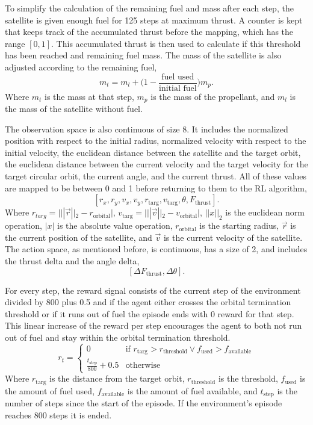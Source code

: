 To simplify the calculation of the remaining fuel and mass after each step, the satellite is given enough fuel for 125 steps at maximum thrust. A counter is kept that keeps track of the accumulated thrust before the mapping, which has the range $[0, 1]$. This accumulated thrust is then used to calculate if this threshold has been reached and remaining fuel mass. The mass of the satellite is also adjusted according to the remaining fuel, $$m_t=m_l+\bigg(1-\frac{\text{fuel used}}{\text{initial fuel}}\bigg)m_p.$$ Where $m_t$ is the mass at that step, $m_p$ is the mass of the propellant, and $m_l$ is the mass of the satellite without fuel.

The observation space is also continuous of size 8. It includes the normalized position with respect to the initial radius, normalized velocity with respect to the initial velocity, the euclidean distance between the satellite and the target orbit, the euclidean distance between the current velocity and the target velocity for the target circular orbit, the current angle, and the current thrust. All of these values are mapped to be between 0 and 1 before returning to them to the RL algorithm,
$$[r_x, r_y, v_x, v_y, r_{\text{targ}}, v_{\text{targ}}, \theta, F_{\text{thrust}}].$$
Where $r_{targ}=|||\vec{r}||_2 - r_\text{orbital}|$, $v_{\text{targ}}=|||\vec{v}||_2-v_\text{orbital}|$, $||x||_2$ is the euclidean norm operation, $|x|$ is the absolute value operation, $r_\text{orbital}$ is the starting radius, $\vec{r}$ is the current position of the satellite, and $\vec{v}$ is the current velocity of the satellite. The action space, as mentioned before, is continuous, has a size of 2, and includes the thrust delta and the angle delta, $$[\Delta F_{\text{thrust}}, \Delta \theta].$$ 

For every step, the reward signal consists of the current step of the environment divided by 800 plus 0.5 and if the agent either crosses the orbital termination threshold or if it runs out of fuel the episode ends with 0 reward for that step. This linear increase of the reward per step encourages the agent to both not run out of fuel and stay within the orbital termination threshold. $$
r_t = \begin{cases}
	0 & \mbox{if }r_{\text{targ}}>r_{\text{threshold}}\lor f_{\text{used}}>f_{\text{available}} \\
	\frac{t_{\text{step}}}{800} + 0.5 & \mbox{otherwise}
\end{cases}
$$ 
Where $r_{\text{targ}}$ is the distance from the target orbit, $r_{\text{threshold}}$ is the threshold, $f_{\text{used}}$ is the amount of fuel used, $f_{\text{available}}$ is the amount of fuel available, and $t_{\text{step}}$ is the number of steps since the start of the episode. If the environment's episode reaches 800 steps it is ended. 

